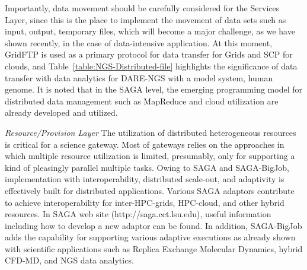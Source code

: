 \documentclass{sig-alternate}
\begin{document}
Importantly, data movement should be carefully considered for the Services Layer, since this is the place to implement the movement of data sets such as input, output, temporary files, which will become a major challenge, as we have shown recently, in the case of data-intensive application\cite{ecmls11}. At this moment, GridFTP is used as a primary protocol for data transfer for Grids and SCP for clouds, and Table~\ref{table:NGS-Distributed-file} highlights the significance of data transfer with data analytics for DARE-NGS with a model system, human genome.  It is noted that in the SAGA level, the emerging programming model for distributed data management such as MapReduce and cloud utilization are already developed and utilized\cite{abstractions-azure,saga-ccgrid10}.

%

\textit{Resource/Provision Layer}
The utilization of distributed heterogeneous resources is critical for a science gateway.  Most of gateways relies on the approaches in which multiple resource utilization is limited, presumably, only for supporting a kind of pleasingly parallel multiple tasks.  Owing to SAGA and SAGA-BigJob, implementation with interoperability, distributed scale-out, and adaptivity is effectively built for distributed applications.  Various SAGA adaptors contribute to achieve interoperability for inter-HPC-grids, HPC-cloud, and other hybrid resources.  In SAGA web site (http://saga.cct.lsu.edu), useful information including how to develop a new adaptor can be found.  In addition, SAGA-BigJob adds the capability for supporting various adaptive executions as already shown with scientific applications such as Replica Exchange Molecular Dynamics, hybrid CFD-MD, and NGS data analytics\cite{saga-royalsoc,coupled,ecmls11}.    
\end{document}
